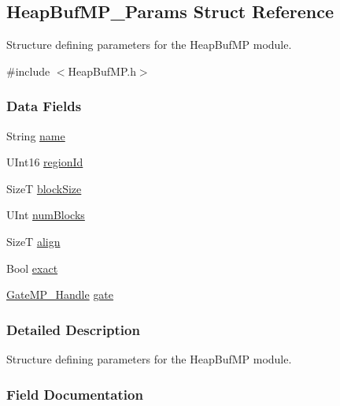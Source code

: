 \subsection{Heap\-Buf\-M\-P\-\_\-\-Params Struct Reference}
\label{struct_heap_buf_m_p___params}


Structure defining parameters for the Heap\-Buf\-M\-P module.  




{\ttfamily \#include $<$Heap\-Buf\-M\-P.\-h$>$}

\subsubsection*{Data Fields}
\begin{DoxyCompactItemize}
\item 
String \hyperlink{struct_heap_buf_m_p___params_aaefdf87660dc3b0a57d33f10791dcc02}{name}
\item 
U\-Int16 \hyperlink{struct_heap_buf_m_p___params_a22f33c326f94898613b8d40335be4eee}{region\-Id}
\item 
Size\-T \hyperlink{struct_heap_buf_m_p___params_afc5038de12c1e9bf75d642c1081b74ac}{block\-Size}
\item 
U\-Int \hyperlink{struct_heap_buf_m_p___params_a4e85da751892052ed1fddc3376f64d9d}{num\-Blocks}
\item 
Size\-T \hyperlink{struct_heap_buf_m_p___params_a0b16778e64598aca34ee44c746374203}{align}
\item 
Bool \hyperlink{struct_heap_buf_m_p___params_a1ebbb52b6985282c23f534da4ac27eaa}{exact}
\item 
\hyperlink{_gate_m_p_8h_ad5bb259f928a14e98d973334bc60ebb3}{Gate\-M\-P\-\_\-\-Handle} \hyperlink{struct_heap_buf_m_p___params_a3b1ef95defb6c91953bd53050489644e}{gate}
\end{DoxyCompactItemize}


\subsubsection{Detailed Description}
Structure defining parameters for the Heap\-Buf\-M\-P module. 

\subsubsection{Field Documentation}
